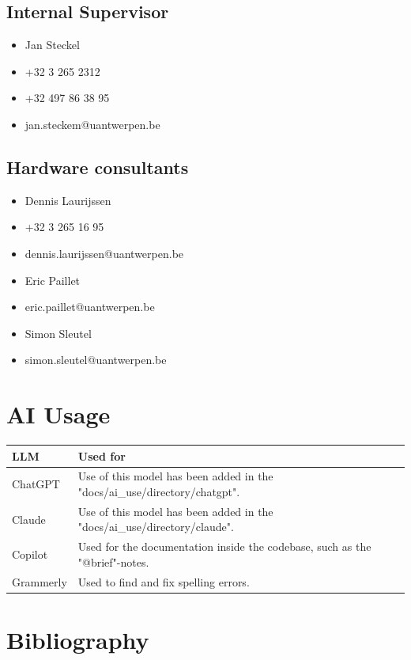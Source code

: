 \documentclass[ti,oneside,10pt]{uantwerpenreport}
\begin{document}
\section{Internal Supervisor}
\begin{itemize}
    \item Jan Steckel
    \item +32 3 265 2312
    \item +32 497 86 38 95
    \item jan.steckem@uantwerpen.be
\end{itemize}

\section{Hardware consultants}
\begin{itemize}
    \item Dennis Laurijssen
    \item +32 3 265 16 95
    \item dennis.laurijssen@uantwerpen.be
\end{itemize}
\begin{itemize}
    \item Eric Paillet
    \item eric.paillet@uantwerpen.be
\end{itemize}
\begin{itemize}
    \item Simon Sleutel
    \item simon.sleutel@uantwerpen.be
\end{itemize}

\chapter*{AI Usage}
\begin{table}[h!]
    \centering
    \begin{tabular}{ll}
        \toprule
            \textbf{LLM} & \textbf{Used for} \\
        \midrule
            ChatGPT     & Use of this model has been added in the "docs/ai\_use/directory/chatgpt". \\
            Claude      & Use of this model has been added in the "docs/ai\_use/directory/claude". \\
            Copilot     & Used for the documentation inside the codebase, such as the "@brief"-notes. \\
            Grammerly   & Used to find and fix spelling errors. \\
        \bottomrule
    \end{tabular}
\end{table}


\chapter*{Bibliography}




\end{document}
